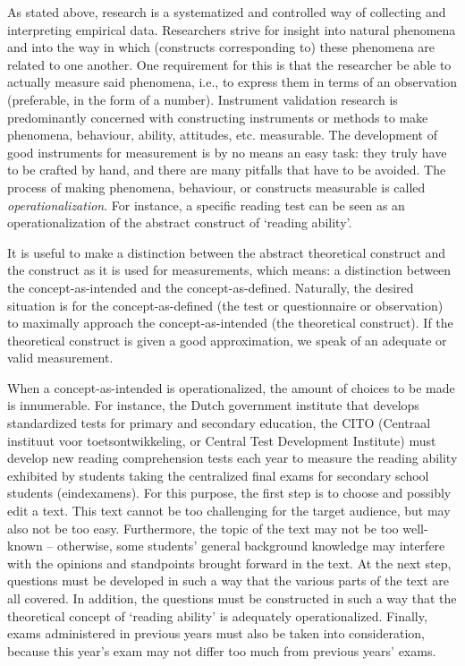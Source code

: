 \documentclass[
]{book}
\begin{document}
As stated above, research is a systematized and controlled way of collecting and interpreting empirical data. Researchers strive for insight into natural phenomena and into the way in which (constructs corresponding to) these phenomena are related to one another. One requirement for this is that the researcher be able to actually measure said phenomena, i.e., to express them in terms of an observation (preferable, in the form of a number). Instrument validation research is predominantly concerned with constructing instruments or methods to make phenomena, behaviour, ability, attitudes, etc. measurable. The development of good instruments for measurement is by no means an easy task: they truly have to be crafted by hand, and there are many pitfalls that have to be avoided. The process of making phenomena, behaviour, or constructs measurable is called \emph{operationalization}. For instance, a specific reading test can be seen as an operationalization of the abstract construct of `reading ability'.

It is useful to make a distinction between the abstract theoretical construct and the construct as it is used for measurements, which means: a distinction between the concept-as-intended and the concept-as-defined. Naturally, the desired situation is for the concept-as-defined (the test or questionnaire or observation) to maximally approach the concept-as-intended (the theoretical construct). If the theoretical construct is given a good approximation, we speak of an adequate or valid measurement.

When a concept-as-intended is operationalized, the amount of choices to be made is innumerable. For instance, the Dutch government institute that develops standardized tests for primary and secondary education, the CITO (Centraal instituut voor toetsontwikkeling, or Central Test Development Institute) must develop new reading comprehension tests each year to measure the reading ability exhibited by students taking the centralized final exams for secondary school students (eindexamens). For this purpose, the first step is to choose and possibly edit a text. This text cannot be too challenging for the target audience, but may also not be too easy. Furthermore, the topic of the text may not be too well-known -- otherwise, some students' general background knowledge may interfere with the opinions and standpoints brought forward in the text. At the next step, questions must be developed in such a way that the various parts of the text are all covered. In addition, the questions must be constructed in such a way that the theoretical concept of `reading ability' is adequately operationalized. Finally, exams administered in previous years must also be taken into consideration, because this year's exam may not differ too much from previous years' exams.
\end{document}
